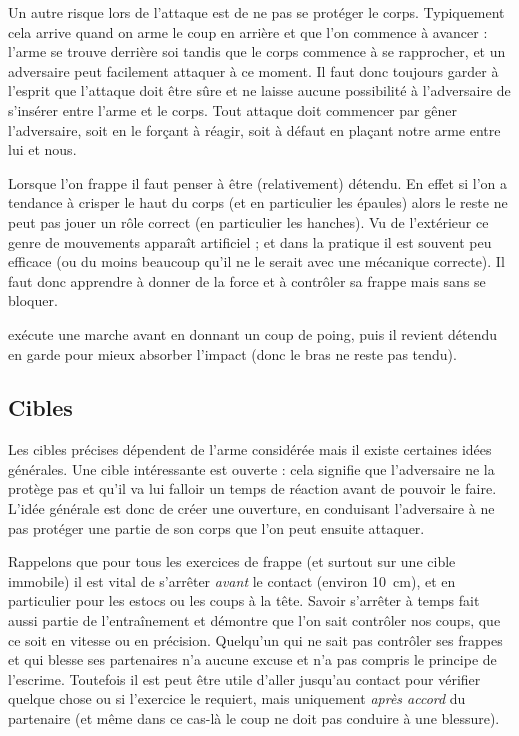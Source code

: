 

Un autre risque lors de l'attaque est de ne pas se protéger le corps.
Typiquement cela arrive quand on arme le coup en arrière et que l'on commence à avancer : l'arme se trouve derrière soi tandis que le corps commence à se rapprocher, et un adversaire peut facilement attaquer à ce moment.
Il faut donc toujours garder à l'esprit que l'attaque doit être sûre et ne laisse aucune possibilité à l'adversaire de s'insérer entre l'arme et le corps.
Tout attaque doit commencer par gêner l'adversaire, soit en le forçant à réagir, soit à défaut en plaçant notre arme entre lui et nous.

Lorsque l'on frappe il faut penser à être (relativement) détendu.
En effet si l'on a tendance à crisper le haut du corps (et en particulier les épaules) alors le reste ne peut pas jouer un rôle correct (en particulier les hanches).
Vu de l'extérieur ce genre de mouvements apparaît artificiel ; et dans la pratique il est souvent peu efficace (ou du moins beaucoup qu'il ne le serait avec une mécanique correcte).
Il faut donc apprendre à donner de la force et à contrôler sa frappe mais sans se bloquer.


\begin{exercice}
	\label{att:ex:marche-poing-détendu}

	\A exécute une marche avant en donnant un coup de poing, puis il revient détendu en garde pour mieux absorber l'impact (donc le bras ne reste pas tendu).
\end{exercice}



\subsection{Cibles}


Les cibles précises dépendent de l'arme considérée mais il existe certaines idées générales.
Une cible intéressante est ouverte : cela signifie que l'adversaire ne la protège pas et qu'il va lui falloir un temps de réaction avant de pouvoir le faire.
L'idée générale est donc de créer une ouverture, en conduisant l'adversaire à ne pas protéger une partie de son corps que l'on peut ensuite attaquer.

Rappelons que pour tous les exercices de frappe (et surtout sur une cible immobile) il est vital de s'arrêter \emph{avant} le contact (environ \SI{10}{cm}), et en particulier pour les estocs ou les coups à la tête.
Savoir s'arrêter à temps fait aussi partie de l'entraînement et démontre que l'on sait contrôler nos coups, que ce soit en vitesse ou en précision.
Quelqu'un qui ne sait pas contrôler ses frappes et qui blesse ses partenaires n'a aucune excuse et n'a pas compris le principe de l'escrime.
Toutefois il est peut être utile d'aller jusqu'au contact pour vérifier quelque chose ou si l'exercice le requiert, mais uniquement \emph{après accord} du partenaire (et même dans ce cas-là le coup ne doit pas conduire à une blessure).


